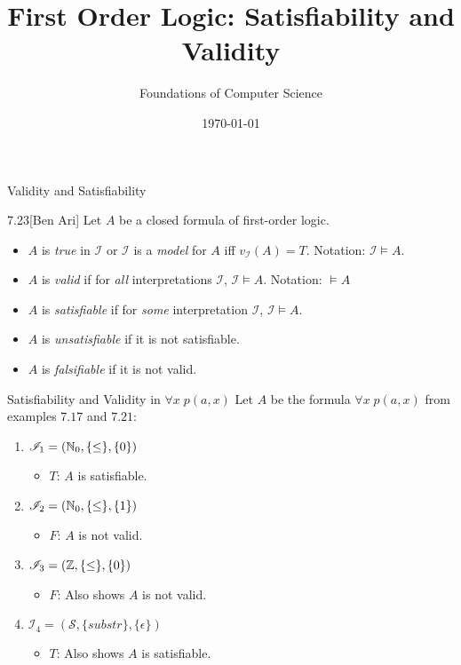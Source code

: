 \documentclass[style=sailor,size=12pt]{powerdot}
\title{First Order Logic: Satisfiability and Validity}
\author{Foundations of Computer Science}
\date{\today}
\begin{document}
\maketitle

\begin{wideslide}[bm=,toc=]{Validity and Satisfiability}
\begin{defn}{7.23}[Ben Ari]
Let $A$ be a closed formula of first-order logic.
\end{defn}
\vspace{-2ex}
\begin{itemize}
\item $A$ is \emph{true} in $\mathcal{I}$ or $\mathcal{I}$ is a \emph{model} for
$A$ iff $v_{\mathcal{I}}(A) = T$. Notation: $\mathcal{I} \models A$.
\item $A$ is \emph{valid} if for \emph{all} interpretations $\mathcal{I}$,
$\mathcal{I} \models A$. Notation: $\models A$ 
\item $A$ is \emph{satisfiable} if for \emph{some} interpretation $\mathcal{I}$,
$\mathcal{I} \models A$.
\item $A$ is \emph{unsatisfiable} if it is not satisfiable. 
\item $A$ is \emph{falsifiable} if it is not valid. 
\end{itemize}

\end{wideslide}

\begin{wideslide}[bm=,toc=]{Satisfiability and Validity in $\forall x \; p(a,x)$}
Let $A$ be the formula $\forall x \; p(a,x)$ from examples $7.17$ and $7.21$:
\begin{enumerate}
\item<2-> $\mathcal{I}_1 = (\mathbb{N}_0,\{\leq\},\{0\})$
\begin{itemize}
\item<3-> $T$: $A$ is satisfiable. 
\end{itemize}
\item<4-> $\mathcal{I}_2 = (\mathbb{N}_0,\{\leq\},\{1\})$
\begin{itemize}
\item<5-> $F$: $A$ is not valid. 
\end{itemize}
\item<6-> $\mathcal{I}_3 = (\mathbb{Z},\{\leq\},\{0\})$
\begin{itemize}
\item<7-> $F$: Also shows $A$ is not valid. 
\end{itemize}
\item<8-> $\mathcal{I}_4 = (\mathcal{S},\{substr\},\{ \epsilon \})$
\begin{itemize}
\item<9-> $T$: Also shows $A$ is satisfiable. 
\end{itemize}
\end{enumerate}
\end{wideslide}
\end{document}
